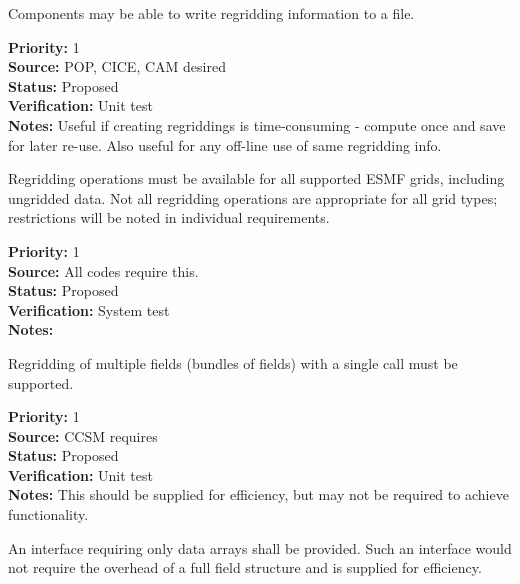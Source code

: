 Components may be able to write regridding information to a file.

\begin{reqlist}
{\bf Priority:} 1 \\
{\bf Source:} POP, CICE, CAM desired \\
{\bf Status:} Proposed \\
{\bf Verification:} Unit test \\
{\bf Notes:} Useful if creating regriddings is time-consuming - compute once
             and save for later re-use.  Also useful for any off-line
             use of same regridding info.
\end{reqlist}


Regridding operations must be available for all supported ESMF grids,
including ungridded data.  Not all regridding operations are appropriate for
all grid types; restrictions will be noted in individual requirements.

\begin{reqlist}
{\bf Priority:} 1 \\
{\bf Source:} All codes require this. \\
{\bf Status:} Proposed \\
{\bf Verification:} System test \\
{\bf Notes:} 
\end{reqlist}


Regridding of multiple fields (bundles of fields) with
a single call must be supported.

\begin{reqlist}
{\bf Priority:} 1  \\
{\bf Source:} CCSM requires \\
{\bf Status:} Proposed \\
{\bf Verification:} Unit test \\
{\bf Notes:} This should be supplied for efficiency, but may not
             be required to achieve functionality.
\end{reqlist}


An interface requiring only data arrays shall be
provided.  Such an interface would not require the overhead
of a full field structure and is supplied for efficiency.

